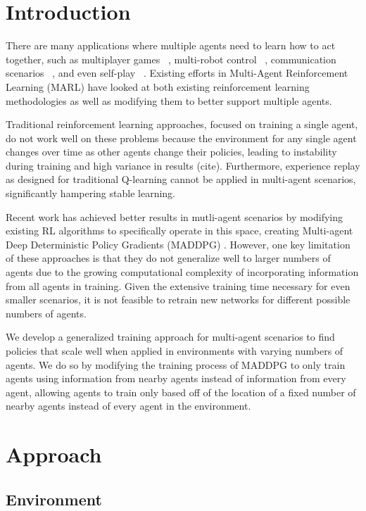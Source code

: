 \documentclass{article}
\begin{document}
\section{Introduction}
\label{submission}

There are many applications where multiple agents need to learn how to act together, such as multiplayer games ~\cite{multigames}, multi-robot control ~\cite{multirobot}, communication scenarios ~\cite{communication}, and even self-play ~\cite{selfplay}. Existing efforts in Multi-Agent Reinforcement Learning (MARL) have looked at both existing reinforcement learning methodologies as well as modifying them to better support multiple agents.

Traditional reinforcement learning approaches, focused on training a single agent, do not work well on these problems because the environment for any single agent changes over time as other agents change their policies, leading to instability during training and high variance in results (cite). Furthermore, experience replay as designed for traditional Q-learning cannot be applied in multi-agent scenarios, significantly hampering stable learning.

Recent work has achieved better results in mutli-agent scenarios by modifying existing RL algorithms to specifically operate in this space, creating Multi-agent Deep Deterministic Policy Gradients (MADDPG) \cite{maddpg}. However, one key limitation of these approaches is that they do not generalize well to larger numbers of agents due to the growing computational complexity of incorporating information from all agents in training. Given the extensive training time necessary for even smaller scenarios, it is not feasible to retrain new networks for different possible numbers of agents.

We develop a generalized training approach for multi-agent scenarios to find policies that scale well when applied in environments with varying numbers of agents. We do so by modifying the training process of MADDPG to only train agents using information from nearby agents instead of information from every agent, allowing agents to train only based off of the location of a fixed number of nearby agents instead of every agent in the environment.

\section{Approach}

\subsection{Environment}
\end{document}
